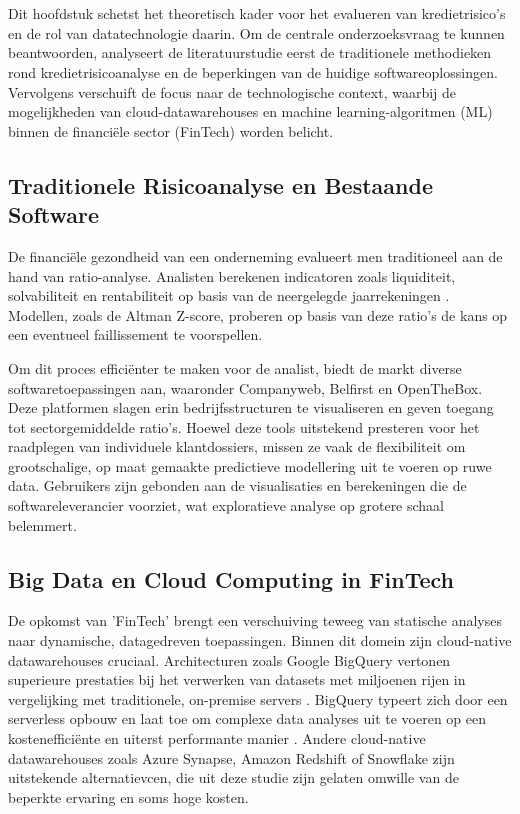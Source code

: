 \chapter{}%
\label{ch:stand-van-zaken}

Dit hoofdstuk schetst het theoretisch kader voor het evalueren van kredietrisico's en de rol van datatechnologie daarin. Om de centrale onderzoeksvraag te kunnen beantwoorden, analyseert de literatuurstudie eerst de traditionele methodieken rond kredietrisicoanalyse en de beperkingen van de huidige softwareoplossingen. Vervolgens verschuift de focus naar de technologische context, waarbij de mogelijkheden van cloud-datawarehouses en machine learning-algoritmen (ML) binnen de financiële sector (FinTech) worden belicht.

\section{Traditionele Risicoanalyse en Bestaande Software}

De financiële gezondheid van een onderneming evalueert men traditioneel aan de hand van ratio-analyse. Analisten berekenen indicatoren zoals liquiditeit, solvabiliteit en rentabiliteit op basis van de neergelegde jaarrekeningen \autocite{Ooghe2021}. Modellen, zoals de Altman Z-score, proberen op basis van deze ratio's de kans op een eventueel faillissement te voorspellen.

Om dit proces efficiënter te maken voor de analist, biedt de markt diverse softwaretoepassingen aan, waaronder Companyweb, Belfirst en OpenTheBox. Deze platformen slagen erin bedrijfsstructuren te visualiseren en geven toegang tot sectorgemiddelde ratio's. Hoewel deze tools uitstekend presteren voor het raadplegen van individuele klantdossiers, missen ze vaak de flexibiliteit om grootschalige, op maat gemaakte predictieve modellering uit te voeren op ruwe data. Gebruikers zijn gebonden aan de visualisaties en berekeningen die de softwareleverancier voorziet, wat exploratieve analyse op grotere schaal belemmert.

\section{Big Data en Cloud Computing in FinTech}

De opkomst van 'FinTech' brengt een verschuiving teweeg van statische analyses naar dynamische, datagedreven toepassingen. Binnen dit domein zijn cloud-native datawarehouses cruciaal. Architecturen zoals Google BigQuery vertonen superieure prestaties bij het verwerken van datasets met miljoenen rijen in vergelijking met traditionele, on-premise servers \autocite{Gupta2024}. BigQuery typeert zich door een serverless opbouw en laat toe om complexe data analyses uit te voeren op een kostenefficiënte en uiterst performante manier \autocite{ActiveViam2025}. Andere cloud-native datawarehouses zoals Azure Synapse, Amazon Redshift of Snowflake zijn uitstekende alternatievcen, die uit deze studie zijn gelaten omwille van de beperkte ervaring en soms hoge kosten.


